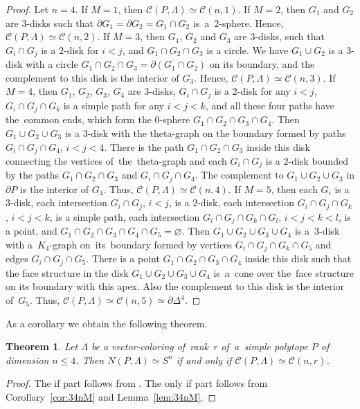 \documentclass[12pt]{amsart}
\newtheorem{theorem}[formula]{Theorem}
\theoremstyle{definition}
\theoremstyle{remark}
\begin{document}
\begin{proof}
Let $n=4$. If $M=1$, then $\mathcal{C}(P,\Lambda)\simeq \mathcal{C}(n,1)$. If $M=2$,
then $G_1$ and $G_2$ are $3$-disks such that $\partial G_1=\partial G_2=G_1\cap G_2$ is~a~$2$-sphere. 
Hence, $\mathcal{C}(P,\Lambda)\simeq \mathcal{C}(n,2)$. If $M=3$, then $G_1$, $G_2$ and $G_3$ are $3$-disks,
such that $G_i\cap G_j$ is a $2$-disk for $i<j$, and $G_1\cap G_2\cap G_3$ is a circle. We have $G_1\cup G_2$
is a $3$-disk with a circle $G_1\cap G_2\cap G_3=\partial (G_1\cap G_2)$ on its boundary, and the complement
to this disk is the interior of $G_3$. Hence, 
$\mathcal{C}(P,\Lambda)\simeq \mathcal{C}(n,3)$. If $M=4$, then  $G_1$, $G_2$, $G_3$, $G_4$ are $3$-disks,
$G_i\cap G_j$ is a $2$-disk for any $i< j$,  $G_i\cap G_j\cap G_k$ is a simple path for any $i<j<k$, and all these
four paths have the~common ends, which form the $0$-sphere $G_1\cap G_2\cap G_3\cap G_4$. Then $G_1\cup G_2\cup G_3$
is a $3$-disk with the theta-graph on the boundary formed by
paths $G_i\cap G_j\cap G_4$, $i<j<4$. There is the path $G_1\cap G_2\cap G_3$ inside this disk
connecting the vertices of~the~theta-graph and each $G_i\cap G_j$ is a $2$-disk bounded by the paths
$G_1\cap G_2\cap G_3$ and $G_i\cap G_j\cap G_4$. The complement to $G_1\cup G_2\cup G_3$ in $\partial P$
is the interior of $G_4$. Thus, $\mathcal{C}(P,\Lambda)\simeq \mathcal{C}(n,4)$. If $M=5$, then each $G_i$
is a $3$-disk, each intersection $G_i\cap G_j$, $i<j$, is a $2$-disk, each intersection $G_i\cap G_j\cap G_k$,
$i<j<k$, is a simple path, each intersection $G_i\cap G_j\cap G_k\cap G_l$, $i<j<k<l$, is a point,
and $G_1\cap G_2\cap G_3\cap G_4\cap G_5=\varnothing$. Then    $G_1\cup G_2\cup G_3\cup G_4$
is a~$3$-disk with a~$K_4$-graph on~its~boundary formed by vertices $G_i\cap G_j\cap G_k\cap G_5$
and edges $G_i\cap G_j\cap G_5$. There is a point $G_1\cap G_2\cap G_3\cap G_4$ inside this disk
such that the face structure in the disk $G_1\cup G_2\cup G_3\cup G_4$ is~a~cone over the~face structure on its boundary 
with this apex. Also the complement to this disk is the interior of~$G_5$. Thus, 
$\mathcal{C}(P,\Lambda)\simeq \mathcal{C}(n,5)\simeq\partial \Delta^4$.

\end{proof}
As a corollary we obtain the following theorem.
\begin{theorem}\label{th:n34}
Let $\Lambda$ be a vector-coloring of~rank~$r$ of~a~simple polytope $P$ of dimension $n\leqslant 4$. 
Then $N(P,\Lambda)\simeq S^n$ if and only if $\mathcal{C}(P,\Lambda)\simeq \mathcal{C}(n,r)$.
\end{theorem}
\begin{proof}
The if part follows from \cite[Construction 5.8]{E24}. The only if part follows from Corollary~\ref{cor:34nM} and 
Lemma~\ref{lem:34nM}.
\end{proof}
\end{document}
